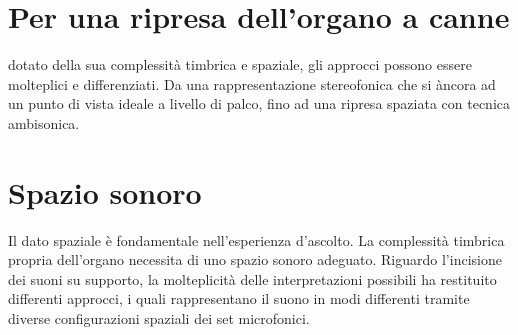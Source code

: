 \newcommand{\mylanguages}{english,italian} %
\newcommand{\mytitle}{Pratiche sperimentali di registrazione dell'organo a canne, differenti approcci di ripresa del suono}
\newcommand{\mysubtitle}{Tecniche e Tecnologie di Ripresa e Registrazione Audio}
\newcommand{\authorone}{Doralma A. Palestra}
\newcommand{\institutione}{Conservatorio N. Piccinni di Bari}
\newcommand{\emailone}{doralma.palestra@gmail.com}



\maketitle
\thispagestyle{empty}
\section*{Per una ripresa dell'organo a canne}
dotato della sua complessità timbrica e spaziale, 
gli approcci possono essere molteplici e differenziati.
Da una rappresentazione stereofonica che si àncora ad un punto di 
vista ideale a livello di palco, fino ad una ripresa spaziata con tecnica 
ambisonica.

\section*{Spazio sonoro}
Il dato spaziale è fondamentale nell'esperienza d'ascolto. La complessità
 timbrica propria dell'organo necessita di uno spazio sonoro adeguato. 
 Riguardo l'incisione dei suoni su supporto, la molteplicità delle 
 interpretazioni possibili ha restituito differenti approcci, i quali 
 rappresentano il suono in modi differenti tramite diverse configurazioni
  spaziali dei set microfonici.   %
